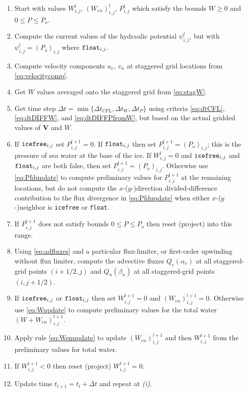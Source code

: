 \documentclass[11pt,final]{amsart}
\newcommand\bV{\mathbf{V}}
\newcommand{\Wlij}{W^l_{i,j}}
\newcommand{\Plij}{P^l_{i,j}}
\begin{document}
\bigskip\medskip
\renewcommand{\labelenumi}{\emph{(\roman{enumi})}}
\begin{enumerate}
\item Start with values $\Wlij$, $(W_{en})_{i,j}^l$, $\Plij$ which satisfy the bounds $W\ge 0$ and $0 \le P \le P_o$.
\item Compute the current values of the hydraulic potential $\psi_{i,j}^l$, but with $\psi_{i,j}^l=(P_o)_{i,j}$ where $\text{\texttt{float}}_{i,j}$.
\item Compute velocity components $u_e$, $v_n$ at staggered grid locations from \eqref{eq:velocitycomp}.
\item Get $W$ values averaged onto the staggered grid from \eqref{eq:stagW}.
\item Get time step $\Delta t = \min\{\Delta t_{\text{CFL}}, \Delta t_W, \Delta t_P\}$ using criteria \eqref{eq:dtCFL}, \eqref{eq:dtDIFFW}, and \eqref{eq:dtDIFFPfromW}, but based on the actual gridded values of $\bV$ and $W$.
\item If $\text{\texttt{icefree}}_{i,j}$ set $P_{i,j}^{l+1}=0$.  If $\text{\texttt{float}}_{i,j}$ then set $P_{i,j}^{l+1} = (P_o)_{i,j}$; this is the pressure of sea water at the base of the ice.  If $\Wlij=0$ and $\text{\texttt{icefree}}_{i,j}$ and $\text{\texttt{float}}_{i,j}$ are both false, then set $P_{i,j}^{l+1} = (P_o)_{i,j}$.  Otherwise use \eqref{eq:Pfdupdate} to compute preliminary values for $P_{i,j}^{l+1}$ at the remaining locations, but do not compute the $x$-($y$-)direction divided-difference contribution to the flux divergence in \eqref{eq:Pfdupdate} when either $x$-($y$-)neighbor is \texttt{icefree} or \texttt{float}.
\item If $P_{i,j}^{l+1}$ does not satisfy bounds $0 \le P \le P_o$ then reset (project) into this range.
\item Using \eqref{eq:adfluxes} and a particular flux-limiter, or first-order upwinding without flux limiter, compute the advective fluxes $Q_e(\alpha_e)$ at all staggered-grid points $(i+1/2,j)$ and $Q_n(\beta_n)$ at all staggered-grid points $(i,j+1/2)$.  
\item If $\text{\texttt{icefree}}_{i,j}$ or $\text{\texttt{float}}_{i,j}$ then set $W_{i,j}^{l+1}=0$ and $(W_{en})_{i,j}^{l+1}=0$.  Otherwise use \eqref{eq:Wupdate} to compute preliminary values for the total water $(W+W_{en})_{i,j}^{l+1}$.
\item Apply rule \eqref{eq:Wenupdate} to update $(W_{en})_{i,j}^{l+1}$ and then $W_{i,j}^{l+1}$ from the preliminary values for total water.
\item If $W_{i,j}^{l+1}<0$ then reset (project) $W_{i,j}^{l+1}=0$.
\item Update time $t_{l+1}=t_l+\Delta t$ and repeat at \emph{(i)}.
\end{enumerate}
\end{document}
